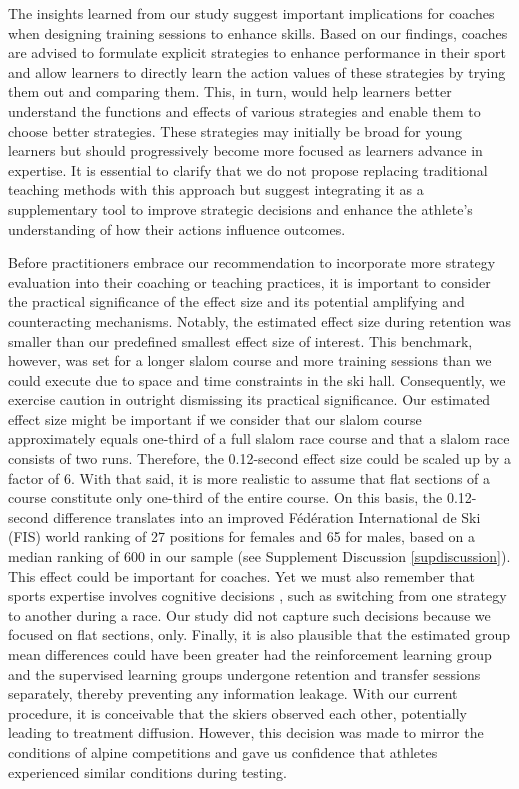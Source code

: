 \documentclass[pdflatex,sn-mathphys-num]{sn-jnl}%
\theoremstyle{thmstyleone}%
\theoremstyle{thmstyletwo}%
\theoremstyle{thmstylethree}%
\begin{document}
The insights learned from our study suggest important implications for coaches when designing training sessions to enhance skills. Based on our findings, coaches are advised to formulate explicit strategies to enhance performance in their sport and allow learners to directly learn the action values of these strategies by trying them out and comparing them. This, in turn, would help learners better understand the functions and effects of various strategies and enable them to choose better strategies. These strategies may initially be broad for young learners but should progressively become more focused as learners advance in expertise. It is essential to clarify that we do not propose replacing traditional teaching methods with this approach but suggest integrating it as a supplementary tool to improve strategic decisions and enhance the athlete's understanding of how their actions influence outcomes.

Before practitioners embrace our recommendation to incorporate more strategy evaluation into their coaching or teaching practices, it is important to consider the practical significance of the effect size and its potential amplifying and counteracting mechanisms\cite{anvari_not_2023}. Notably, the estimated effect size during retention was smaller than our predefined smallest effect size of interest. This benchmark, however, was set for a longer slalom course and more training sessions than we could execute due to space and time constraints in the ski hall. Consequently, we exercise caution in outright dismissing its practical significance. Our estimated effect size might be important if we consider that our slalom course approximately equals one-third of a full slalom race course and that a slalom race consists of two runs. Therefore, the 0.12-second effect size could be scaled up by a factor of 6. With that said, it is more realistic to assume that flat sections of a course constitute only one-third of the entire course. On this basis, the 0.12-second difference translates into an improved Fédération International de Ski (FIS) world ranking of 27 positions for females and 65 for males, based on a median ranking of 600 in our sample (see Supplement Discussion \ref{supdiscussion}). This effect could be important for coaches. Yet we must also remember that sports expertise involves cognitive decisions  \cite{mangalam_investigating_2023, krakauer_motor_2019}, such as switching from one strategy to another during a race. Our study did not capture such decisions because we focused on flat sections, only. Finally, it is also plausible that the estimated group mean differences could have been greater had the reinforcement learning group and the supervised learning groups undergone retention and transfer sessions separately, thereby preventing any information leakage. With our current procedure, it is conceivable that the skiers observed each other, potentially leading to treatment diffusion. However, this decision was made to mirror the conditions of alpine competitions and gave us confidence that athletes experienced similar conditions during testing.
\end{document}

